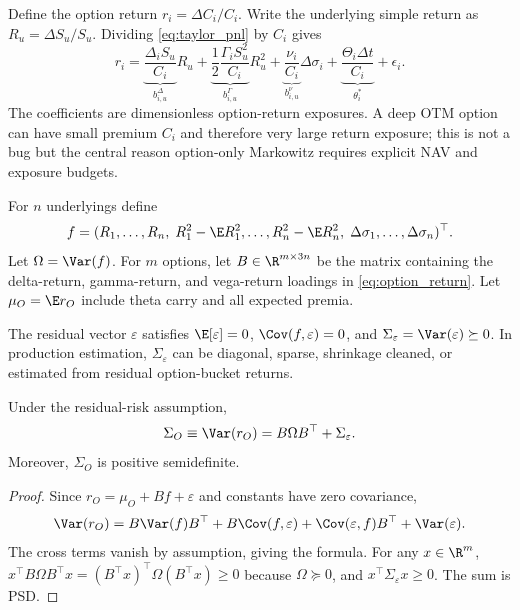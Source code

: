 Define the option return $r_i=\Delta C_i/C_i$.  Write the underlying
simple return as $R_u=\Delta S_u/S_u$.  Dividing
\eqref{eq:taylor_pnl} by $C_i$ gives
\begin{equation}
 r_i
 =
 \underbrace{\frac{\Delta_i S_u}{C_i}}_{b^{\Delta}_{i,u}}R_u
 +\underbrace{\frac12\frac{\Gamma_i S_u^2}{C_i}}_{b^{\Gamma}_{i,u}}R_u^2
 +\underbrace{\frac{\nu_i}{C_i}}_{b^{\nu}_{i,u}}\Delta\sigma_i
 +\underbrace{\frac{\Theta_i\Delta t}{C_i}}_{\theta_i^\ast}
 +\epsilon_i .
 \label{eq:option_return}
\end{equation}
The coefficients are dimensionless option-return exposures.  A deep OTM
option can have small premium $C_i$ and therefore very large return
exposure; this is not a bug but the central reason option-only
Markowitz requires explicit NAV and exposure budgets.

\begin{definition}
For $n$ underlyings define
\[
 f=
 (R_1,\ldots,R_n,\;R_1^2-\E R_1^2,\ldots,R_n^2-\E R_n^2,\;
 \Delta\sigma_1,\ldots,\Delta\sigma_n)^\top .
\]
Let $\Omega=\Var(f)$.  For $m$ options, let $B\in\R^{m\times 3n}$ be the
matrix containing the delta-return, gamma-return, and vega-return
loadings in \eqref{eq:option_return}.  Let
$\mu_O=\E r_O$ include theta carry and all expected premia.
\end{definition}

\begin{assumption}
The residual vector $\varepsilon$ satisfies $\E[\varepsilon]=0$,
$\Cov(f,\varepsilon)=0$, and
$\Sigma_\varepsilon=\Var(\varepsilon)\succeq0$.  In production
estimation, $\Sigma_\varepsilon$ can be diagonal, sparse, shrinkage
cleaned, or estimated from residual option-bucket returns.
\end{assumption}

\begin{proposition}
\label{prop:covariance}
Under the residual-risk assumption,
\[
      \Sigma_O \equiv \Var(r_O) = B\Omega B^\top + \Sigma_\varepsilon .
\]
Moreover, $\Sigma_O$ is positive semidefinite.
\end{proposition}

\begin{proof}
Since $r_O=\mu_O+Bf+\varepsilon$ and constants have zero covariance,
\[
\Var(r_O)=B\Var(f)B^\top+B\Cov(f,\varepsilon)+
\Cov(\varepsilon,f)B^\top+\Var(\varepsilon).
\]
The cross terms vanish by assumption, giving the formula.  For any
$x\in\R^m$,
$x^\top B\Omega B^\top x=(B^\top x)^\top\Omega(B^\top x)\ge0$ because
$\Omega\succeq0$, and $x^\top\Sigma_\varepsilon x\ge0$.  The sum is PSD.
\end{proof}


